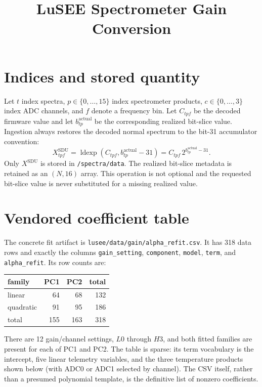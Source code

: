 \documentclass[11pt]{article}
\title{LuSEE Spectrometer Gain Conversion}
\author{}
\date{}
\newcommand{\SDU}{\mathrm{SDU}}
\begin{document}
\maketitle

\section{Indices and stored quantity}

Let $t$ index spectra, $p\in\{0,\ldots,15\}$ index spectrometer
products, $c\in\{0,\ldots,3\}$ index ADC channels, and $f$ denote a
frequency bin.  Let $C_{tpf}$ be the decoded firmware value and let
$b^{\mathrm{actual}}_{tp}$ be the corresponding realized bit-slice value.
Ingestion always restores the decoded normal spectrum to the bit-31
accumulator convention:
\begin{equation}
  X^{\SDU}_{tpf}
  = \operatorname{ldexp}\!\left(C_{tpf},
      b^{\mathrm{actual}}_{tp}-31\right)
  = C_{tpf}\,2^{b^{\mathrm{actual}}_{tp}-31}.
  \label{eq:bitslice}
\end{equation}
Only $X^{\SDU}$ is stored in \texttt{/spectra/data}.  The realized
bit-slice metadata is retained as an $(N,16)$ array.  This operation is
not optional and the requested bit-slice value is never substituted for a
missing realized value.

\section{Vendored coefficient table}

The concrete fit artifact is \texttt{lusee/data/gain/alpha\_refit.csv}.  It
has 318 data rows and exactly the columns
\texttt{gain\_setting}, \texttt{component}, \texttt{model}, \texttt{term},
and \texttt{alpha\_refit}.  Its row counts are:
\begin{center}
\begin{tabular}{lrrr}
\toprule
family & PC1 & PC2 & total \\
\midrule
linear    & 64 & 68 & 132 \\
quadratic & 91 & 95 & 186 \\
\midrule
total     & 155 & 163 & 318 \\
\bottomrule
\end{tabular}
\end{center}
There are 12 gain/channel settings, $L0$ through $H3$, and both fitted
families are present for each of PC1 and PC2.  The table is sparse: its term
vocabulary is the intercept, five linear telemetry variables, and the three
temperature products shown below (with ADC0 or ADC1 selected by channel).
The CSV itself, rather than a presumed polynomial template, is the definitive
list of nonzero coefficients.
\end{document}
